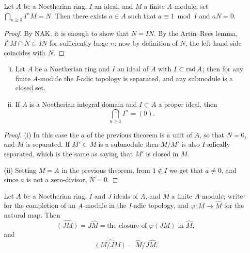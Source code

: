 \begin{theorem}[Krull]\label{thm:8.9}
Let $A$ be a Noetherian ring, $I$ an ideal, and $M$
a finite $A$-module; set $\bigcap_{n \ge 0} I^nM = N$. Then there exists $a \in A$ such that
$a \equiv 1 \bmod I$ and $aN = 0$.
\end{theorem}

\begin{proof}
By NAK, it is enough to show that $N = IN$. By the Artin--Rees
lemma, $I^nM \cap N \subset IN$ for sufficiently large $n$; now by definition of $N$, the
left-hand side coincides with $N$.
\end{proof}

\begin{theorem}\label{thm:8.10}
\begin{enumerate}[(i)]
  \item Let $A$ be a Noetherian ring and $I$ an ideal of $A$ with $I \subset \operatorname{rad} A$; then for
        any finite $A$-module the $I$-adic topology is separated, and any submodule is
        a closed set.
  \item If $A$ is a Noetherian integral domain and $I \subset A$ a proper ideal, then
        \[
          \bigcap_{n \ge 1} I^n = (0).
        \]
\end{enumerate}
\end{theorem}

\begin{proof}
(i) In this case the $a$ of the previous theorem is a unit of $A$, so that
$N = 0$, and $M$ is separated. If $M' \subset M$ is a submodule then $M/M'$ is also
$I$-adically separated, which is the same as saying that $M'$ is closed in $M$.

(ii) Setting $M = A$ in the previous theorem, from $1 \notin I$ we get that $a \neq 0$,
and since $a$ is not a zero-divisor, $N = 0$.
\end{proof}

\begin{theorem}\label{thm:8.11}
Let $A$ be a Noetherian ring, $I$ and $J$ ideals of $A$, and $M$ a
finite $A$-module; write $\hat{\;}$ for the completion of an $A$-module in the $I$-adic
topology, and $\varphi\colon M \to \hat{M}$ for the natural map. Then
\[
  \widehat{(JM)} = J\hat{M} = \text{the closure of } \varphi(JM) \text{ in } \hat{M},
\]
and
\[
  \widehat{(M/JM)} = \hat{M}/J\hat{M}.
\]
\end{theorem}

